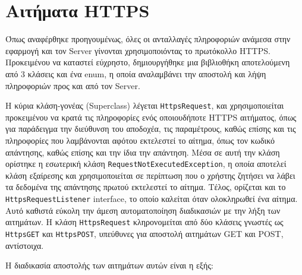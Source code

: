 \section{Αιτήματα HTTPS}
	Όπως αναφέρθηκε προηγουμένως, όλες οι ανταλλαγές πληροφοριών ανάμεσα στην εφαρμογή και τον Server γίνονται χρησιμοποιόντας το πρωτόκολλο HTTPS. Προκειμένου να καταστεί εύχρηστο, δημιουργήθηκε μια βιβλιοθήκη αποτελούμενη από 3 κλάσεις και ένα enum, η οποία αναλαμβάνει την αποστολή και λήψη πληροφοριών προς και από τον Server.

	Η κύρια κλάση-γονέας (Superclass) λέγεται \verb|HttpsRequest|, και χρησιμοποιείται προκειμένου να κρατά τις πληροφορίες ενός οποιουδήποτε HTTPS αιτήματος, όπως για παράδειγμα την διεύθυνση του αποδοχέα, τις παραμέτρους, καθώς επίσης και τις πληροφορίες που λαμβάνονται αφότου εκτελεστεί το αίτημα, όπως τον κωδικό απάντησης, καθώς επίσης και την ίδια την απάντηση. Μέσα σε αυτή την κλάση ορίστηκε η εσωτερική κλάση \verb|RequestNotExecutedException|, η οποία αποτελεί κλάση εξαίρεσης και χρησιμοποιείται σε περίπτωση που ο χρήστης ζητήσει να λάβει τα δεδομένα της απάντησης πρωτού εκτελεστεί το αίτημα. Τέλος, ορίζεται και το \verb|HttpsRequestListener| interface, το οποίο καλείται όταν ολοκληρωθεί ένα αίτημα. Αυτό καθιστά εύκολη την άμεση αυτοματοποίηση διαδικασιών με την λήξη των αιτημάτων.	Η κλάση \verb|HttpsRequest| κληρονομείται από δύο κλάσεις γνωστές ως \verb|HttpsGET| και \verb|HttpsPOST|, υπεύθυνες για αποστολή αιτημάτων GET και POST, αντίστοιχα. 

	Η διαδικασία αποστολής των αιτημάτων αυτών είναι η εξής:

